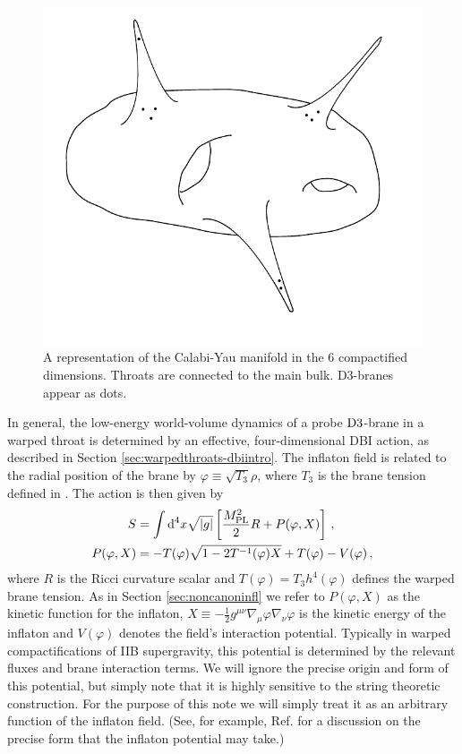 % 
\begin{figure}[htbp]
 \centering
 \includegraphics[width=\textwidth]{dbi/graphs/cymanifold}
 \caption[Calabi-Yau Manifold]{A representation of the Calabi-Yau manifold in the 6
compactified
dimensions. Throats are connected to the main bulk. D3-branes appear as dots.}
 \label{fig:braneworld}
\end{figure}
% 

In general, the low-energy world-volume dynamics
of a probe ${\rm D3}$-brane in a warped throat is determined 
by an effective, four-dimensional DBI action, as described in Section
\ref{sec:warpedthroats-dbiintro}.
The inflaton field is related to the radial 
position of the brane by 
$\varphi \equiv \sqrt{T_3} \rho$, where $T_3$ 
is the brane tension defined in . The action is
then given by \cite{brane6}
% 
\begin{align}
\label{eq:DBIaction-dbiintro}
S &=\int  \mathrm{d}^4x \sqrt{|g|} \left[ \frac{M_{\mathrm{PL}}^2}{2} R 
+ P (\varphi , X) \right] \,,\\
\label{eq:Pdefn-dbiintro}
P( \varphi ,X) &= - T (\varphi)  \sqrt{1 - 2T^{-1} (\varphi ) X}
+T (\varphi)  -V(\varphi)  \,,
\end{align}
% 
where $R$ is the Ricci curvature scalar and $T(\varphi ) = T_3 h^4 (\varphi )$
defines the warped brane tension. As in Section \ref{sec:noncanoninfl} we refer
to $P(\varphi , X)$ as the kinetic function for the inflaton, 
$X \equiv - \frac{1}{2} g^{\mu\nu} \nabla_{\mu} \varphi \nabla_{\nu} \varphi$
is the kinetic energy of the inflaton and $V(\varphi )$ denotes 
the field's interaction 
potential. 
Typically in warped compactifications of 
IIB supergravity, this potential is determined by the 
relevant fluxes and brane interaction terms. 
We will ignore the precise origin
and form of this potential, but simply
note that it is highly sensitive to the string theoretic construction. For the
purpose of this note we will simply treat it 
as an arbitrary function of the inflaton field.
(See, for example, Ref. \cite{brane5} for a discussion 
on the precise form that the inflaton potential may take.)


